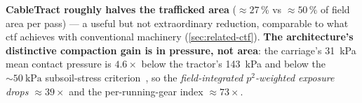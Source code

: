 \documentclass[11pt,a4paper]{article}
\begin{document}
\begin{table}[H]
\centering\small
\caption{Per-field compaction summary with the corrected per-swath carriage accounting. The per-running-gear index reduction ($73\times$) combines the $4.6\times$ lower mean pressure (squared, ${\approx}21\times$) with the ${\approx}3.5\times$ smaller contact area and is field-independent; the field-integrated $p^2$ exposure additionally weights by trafficked area.}\label{tab:compaction}
\end{table}

\textbf{CableTract roughly halves the trafficked area} (${\approx}27\,\%$ vs ${\approx}50\,\%$ of field area per pass) --- a useful but not extraordinary reduction, comparable to what \gls{ctf} achieves with conventional machinery (\cref{sec:related-ctf}). \textbf{The architecture's distinctive compaction gain is in pressure, not area}: the carriage's \SI{31}{\kilo\pascal} mean contact pressure is $4.6\times$ below the tractor's \SI{143}{\kilo\pascal} and below the ${\sim}\SI{50}{\kilo\pascal}$ subsoil-stress criterion~\cite{schjonning2012rules}, so the \emph{field-integrated $p^2$-weighted exposure drops ${\approx}39\times$} and the per-running-gear index ${\approx}73\times$.
\end{document}
